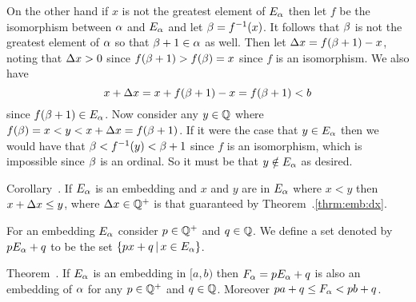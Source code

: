 \begin{solution}
{        On the other hand if $x$ is not the greatest element of $E_\alpha$ then let $f$ be the isomorphism between $\alpha$ and $E_\alpha$ and let $\beta = f^{-1}(x)$.
        It follows that $\beta$ is not the greatest element of $\alpha$ so that $\beta + 1 \in \alpha$ as well.
        Then let $\Delta x = f(\beta+1) - x$, noting that $\Delta x > 0$ since $f(\beta+1) > f(\beta) = x$ since $f$ is an isomorphism.
        We also have
        $$
        x + \Delta x = x + f(\beta+1) - x = f(\beta+1) < b
        $$
        since $f(\beta+1) \in E_\alpha$.
        Now consider any $y \in \mathbb{Q}$ where $f(\beta) = x < y < x + \Delta x = f(\beta+1)$.
        If it were the case that $y \in E_\alpha$ then we would have that $\beta < f^{-1}(y) < \beta + 1$ since $f$ is an isomorphism, which is impossible since $\beta$ is an ordinal.
        So it must be that $y \notin E_\alpha$ as desired. \qedsymbol
    }

    \begin{statement}{Corollary~\ex.}
        If $E_\alpha$ is an embedding and $x$ and $y$ are in $E_\alpha$ where $x < y$ then $x + \Delta x \leq y$, where $\Delta x \in \mathbb{Q}^+$ is that guaranteed by Theorem~\ex.\ref{thrm:emb:dx}.
    \end{statement}


    For an embedding $E_\alpha$ consider $p \in \mathbb{Q}^+$ and $q \in \mathbb{Q}$.
    We define a set denoted by $pE_\alpha + q$ to be the set $\left\{ px + q \,|\, x \in E_\alpha \right\}$.

    \begin{statement}{Theorem~\ex.}
        If $E_\alpha$ is an embedding in $[a, b)$ then $F_\alpha = pE_\alpha + q$ is also an embedding of $\alpha$ for any $p \in \mathbb{Q}^+$ and $q \in \mathbb{Q}$.
        Moreover $pa + q \leq F_\alpha < pb + q$.
    \end{statement}

\end{solution}
